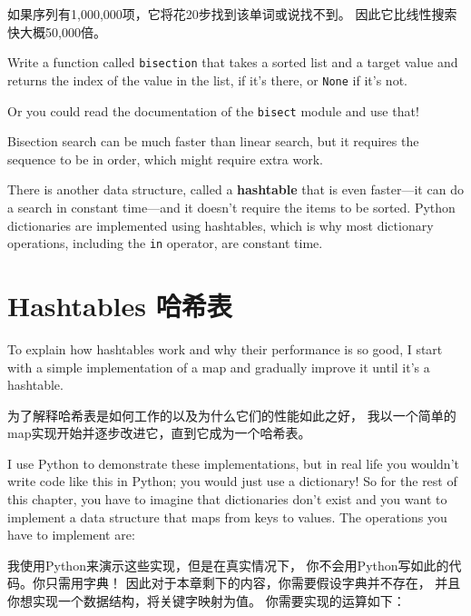 \documentclass[10pt]{book}
\begin{document}
\begin{CJK}{UTF8}{gbsn}
如果序列有1,000,000项，它将花20步找到该单词或说找不到。
因此它比线性搜索快大概50,000倍。

\begin{exercise}

Write a function called {\tt bisection} that takes a sorted list
and a target value and returns the index of the value
in the list, if it's there, or {\tt None} if it's not.


Or you could read the documentation of the {\tt bisect} module
and use that!

\end{exercise}

Bisection search can be much faster than linear search, but
it requires the sequence to be in order, which might require
extra work.

There is another data structure, called a {\bf hashtable} that
is even faster---it can do a search in constant time---and it
doesn't require the items to be sorted.  Python dictionaries
are implemented using hashtables, which is why most dictionary
operations, including the {\tt in} operator, are constant time.


\section{Hashtables 哈希表}
\label{hashtable}

To explain how hashtables work and why their performance is so
good, I start with a simple implementation of a map and
gradually improve it until it's a hashtable.

为了解释哈希表是如何工作的以及为什么它们的性能如此之好，
我以一个简单的map实现开始并逐步改进它，直到它成为一个哈希表。

I use Python to demonstrate these implementations, but in real
life you wouldn't write code like this in Python; you would just use a
dictionary!  So for the rest of this chapter, you have to imagine that
dictionaries don't exist and you want to implement a data structure
that maps from keys to values.  The operations you have to
implement are:

我使用Python来演示这些实现，但是在真实情况下，
你不会用Python写如此的代码。你只需用字典！
因此对于本章剩下的内容，你需要假设字典并不存在，
并且你想实现一个数据结构，将关键字映射为值。
你需要实现的运算如下：

\begin{description}


\end{description}
\end{CJK}
\end{document}
